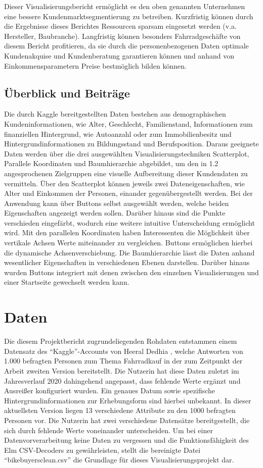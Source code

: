 \documentclass[usegeometry=true]{scrartcl}
\begin{document}
Dieser Visualisierungsbericht ermöglicht es den oben genannten Unternehmen eine bessere Kundenmarktsegmentierung zu betreiben.  Kurzfristig können durch die Ergebnisse dieses Berichtes Ressourcen sparsam eingesetzt werden (v.a. Hersteller, Baubranche). Langfristig können besonders Fahrradgeschäfte von diesem Bericht profitieren, da sie durch die personenbezogenen Daten optimale Kundenakquise und Kundenberatung garantieren können und anhand von Einkommensparametern Preise bestmöglich bilden können. 



\subsection{Überblick und Beiträge}
Die durch Kaggle bereitgestellten Daten bestehen aus demographischen Kundeninformationen, wie Alter, Geschlecht, Familienstand,  Informationen zum finanziellen Hintergrund, wie Autoanzahl oder zum Immobilienbesitz und Hintergrundinformationen zu Bildungsstand und Berufsposition. Daraus geeignete Daten werden über die drei ausgewählten Visualisierungstechniken Scatterplot, Parallele Koordinaten und Baumhierarchie abgebildet, um den in 1.2 angesprochenen Zielgruppen eine visuelle Aufbereitung dieser Kundendaten zu vermitteln. Über den Scatterplot können jeweils zwei Dateneigenschaften, wie Alter und Einkommen der Personen, einander gegenübergestellt werden. Bei der Anwendung kann über Buttons selbst ausgewählt werden, welche beiden Eigenschaften angezeigt werden sollen. Darüber hinaus sind die Punkte verschieden eingefärbt, wodurch eine weitere intuitive Unterscheidung ermöglicht wird. Mit den parallelen Koordinaten haben Interessenten die Möglichkeit über vertikale Achsen Werte miteinander zu vergleichen. Buttons ermöglichen hierbei die dynamische Achsenverschiebung. Die Baumhierarchie lässt die Daten anhand wesentlicher Eigenschaften in verschiedenen Ebenen darstellen. 
Darüber hinaus wurden Buttons integriert mit denen zwischen den einzelnen Visualisierungen und einer Startseite gewechselt werden kann. 

\section{Daten}
Die diesem Projektbericht zugrundeliegenden Rohdaten entstammen einem Datensatz des "`Kaggle"'-Accounts von Heeral Dedhia \cite{Dedhia.22.09.2020}, welche Antworten von 1.000 befragten Personen zum Thema Fahrradkauf in der zum Zeitpunkt der Arbeit zweiten Version bereitstellt. Die Nutzerin hat diese Daten zuletzt im Jahresverlauf 2020 dahingehend angepasst, dass fehlende Werte ergänzt und Ausreißer konfiguriert wurden. Ein genaues Datum sowie spezifische Hintergrundinformationen zur Erhebungsform sind hierbei unbekannt. In dieser aktuellsten Version liegen 13 verschiedene Attribute zu den 1000 befragten Personen vor. Die Nutzerin hat zwei verschiedene Datensätze bereitgestellt, die sich durch fehlende Werte voneinander unterscheiden. Um bei einer Datenvorverarbeitung keine Daten zu vergessen und die Funktionsfähigkeit des Elm CSV-Decoders zu gewährleisten, stellt die bereinigte Datei "`bikebuyersclean.csv"' die Grundlage für dieses Visualisierungsprojekt dar.
\end{document}
